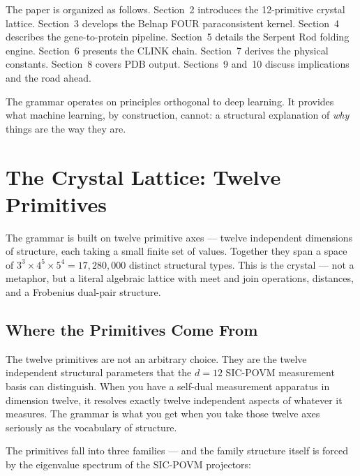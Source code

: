 \documentclass[11pt,a4paper,twocolumn]{article}
\begin{document}
The paper is organized as follows. Section~2 introduces the 12-primitive crystal lattice. Section~3 develops the Belnap FOUR paraconsistent kernel. Section~4 describes the gene-to-protein pipeline. Section~5 details the Serpent Rod folding engine. Section~6 presents the CLINK chain. Section~7 derives the physical constants. Section~8 covers PDB output. Sections~9 and~10 discuss implications and the road ahead.

The grammar operates on principles orthogonal to deep learning. It provides what machine learning, by construction, cannot: a structural explanation of \emph{why} things are the way they are.

\section{The Crystal Lattice: Twelve Primitives}

The grammar is built on twelve primitive axes — twelve independent dimensions of structure, each taking a small finite set of values. Together they span a space of $3^3 \times 4^5 \times 5^4 = 17{,}280{,}000$ distinct structural types. This is the crystal — not a metaphor, but a literal algebraic lattice with meet and join operations, distances, and a Frobenius dual-pair structure.

\subsection{Where the Primitives Come From}

The twelve primitives are not an arbitrary choice. They are the twelve independent structural parameters that the $d=12$ SIC-POVM measurement basis can distinguish. When you have a self-dual measurement apparatus in dimension twelve, it resolves exactly twelve independent aspects of whatever it measures. The grammar is what you get when you take those twelve axes seriously as the vocabulary of structure.

The primitives fall into three families — and the family structure itself is forced by the eigenvalue spectrum of the SIC-POVM projectors:
\end{document}
